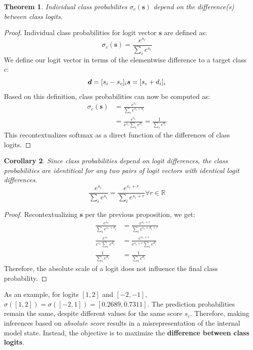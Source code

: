 \documentclass{article}
\theoremstyle{plain}
\newtheorem{theorem}{Theorem}[section]
\newtheorem{corollary}[theorem]{Corollary}
\theoremstyle{definition}
\theoremstyle{remark}
\begin{document}
\begin{theorem}\label{classprobdiff}
	Individual class probabilites $\sigma_c(\bm{s})$ depend on the difference(s) between class logits.
\end{theorem}
\begin{proof} Individual class probabilities for logit vector $\bm{s}$ are defined as:
	\begin{equation}
		\sigma_c(\bm{s}) = \frac{e^{s_c}}{\sum_i e^{s_i}}
	\end{equation}
	We define our logit vector in terms of the elementwise difference to a target class $c$:
	\begin{equation}
		\bm{d} = [s_i - s_c]_i \\
		\bm{s} = [s_c + d_i]_i
	\end{equation}
	Based on this definition, class probabilities can now be computed as:
	\begin{align}
		\sigma_c(\bm{s}) &= \frac{e^{s_c}}{\sum_i e^{s_c+d_i}} \\
				 &= \frac{e^{s_c}}{e^{s_c} \sum_i e^{d_i}} = \frac{1}{\sum_i e^{d_i}}
	\end{align}
	This recontextualizes softmax as a direct function of the differences of class logits.
\end{proof}
\begin{corollary} Since class probabilities depend on logit differences, the class probabilities are identitical for any two pairs of logit vectors with identical logit differences.
	\begin{equation}
		\frac{e^{s_c}}{\sum_i e^{s_i}} = \frac{e^{s_c+r}}{\sum_i e^{s_i+r}} \forall r \in \mathbb{R}
	\end{equation}
\end{corollary}
\begin{proof} Recontextualizing $\bm{s}$ per the previous proposition, we get:
	\begin{align}
		\frac{e^{s_c}}{\sum_i e^{s_c + d_i}} &= \frac{e^{s_c+r}}{\sum_i e^{s_c+d_i+r}} \\
		\frac{e^{s_c}}{e^{s_c}\sum_i e^{d_i}} &= \frac{e^{s_c+r}}{e^{s_c + r} \sum_i e^{d_i}} \\
		\frac{1}{\sum_i e^{d_i}} &= \frac{1}{\sum_i e^{d_i}}
	\end{align}
	Therefore, the absolute scale of a logit does not influence the final class probability.
\end{proof}

As an example, for logits $[1,2]$ and $[-2,-1]$, $\sigma([1,2]) = \sigma([-2,1]) = [0.2689, 0.7311]$. The prediction probabilities remain the same, despite different values for the same score $s_c$. Therefore, making inferences based on \textit{absolute score} results in a misrepresentation of the internal model state. Instead, the objective is to maximize the \textbf{difference between class logits}.
\end{document}
